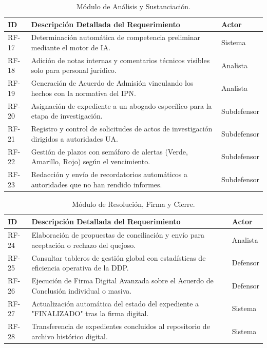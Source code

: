 \begin{table}[h!]
\centering
\scriptsize
\caption{Módulo de Análisis y Sustanciación.}
\label{tab:rf_analisis}
\begin{tabular}{@{} l p{9.5cm} l @{}}
\toprule
\rowcolor[HTML]{2D3E50} 
\textbf{\color[HTML]{FFFFFF} ID} & \textbf{\color[HTML]{FFFFFF} Descripción Detallada del Requerimiento} & \textbf{\color[HTML]{FFFFFF} Actor} \\ \midrule
RF-17 & Determinación automática de competencia preliminar mediante el motor de IA. & Sistema \\
\rowcolor[HTML]{F2F4F7} 
RF-18 & Adición de notas internas y comentarios técnicos visibles solo para personal jurídico. & Analista \\
RF-19 & Generación de Acuerdo de Admisión vinculando los hechos con la normativa del IPN. & Analista \\
\rowcolor[HTML]{F2F4F7} 
RF-20 & Asignación de expediente a un abogado específico para la etapa de investigación. & Subdefensor \\
RF-21 & Registro y control de solicitudes de actos de investigación dirigidos a autoridades UA. & Subdefensor \\
\rowcolor[HTML]{F2F4F7} 
RF-22 & Gestión de plazos con semáforo de alertas (Verde, Amarillo, Rojo) según el vencimiento. & Subdefensor \\
RF-23 & Redacción y envío de recordatorios automáticos a autoridades que no han rendido informes. & Subdefensor \\ \bottomrule
\end{tabular}
\end{table}

\begin{table}[h!]
\centering
\scriptsize
\caption{Módulo de Resolución, Firma y Cierre.}
\label{tab:rf_resolucion}
\begin{tabular}{@{} l p{9.5cm} l @{}}
\toprule
\rowcolor[HTML]{2D3E50} 
\textbf{\color[HTML]{FFFFFF} ID} & \textbf{\color[HTML]{FFFFFF} Descripción Detallada del Requerimiento} & \textbf{\color[HTML]{FFFFFF} Actor} \\ \midrule
RF-24 & Elaboración de propuestas de conciliación y envío para aceptación o rechazo del quejoso. & Analista \\
\rowcolor[HTML]{F2F4F7} 
RF-25 & Consultar tableros de gestión global con estadísticas de eficiencia operativa de la DDP. & Defensor \\
RF-26 & Ejecución de Firma Digital Avanzada sobre el Acuerdo de Conclusión individual o masiva. & Defensor \\
\rowcolor[HTML]{F2F4F7} 
RF-27 & Actualización automática del estado del expediente a "FINALIZADO" tras la firma digital. & Sistema \\
RF-28 & Transferencia de expedientes concluidos al repositorio de archivo histórico digital. & Sistema \\ \bottomrule
\end{tabular}
\end{table}

